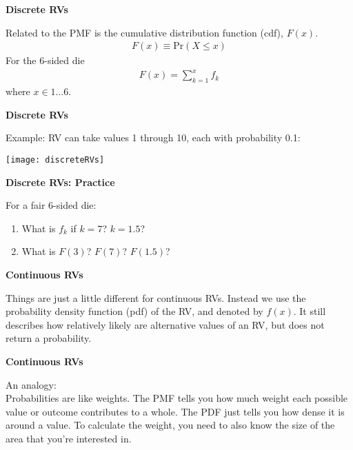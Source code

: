 \documentclass[12pt,xcolor=svgnames]{beamer}
\newcommand{\bl}{\color{blue}}
\newcommand{\theme}{\color{FireBrick}}
\newcommand{\sk}{\vspace{.4cm}}
\newcommand{\nsk}{\vspace{-.4cm}}
\newcommand{\chap}[1]{{\theme \Large \bf #1} \sk}
\newcommand{\pr}{\text{Pr}}
\begin{document}
\begin{frame}
\chap{Discrete RVs}

Related to the PMF is the {\bl cumulative distribution function} (cdf), $F(x)$. 
\begin{align*}
F(x) \equiv \pr(X \leq x)
\end{align*}
For the 6-sided die
\nsk
\begin{align*}
F(x)= \sum_{k=1}^x f_k
\end{align*}
where $x \in 1\dots 6$.  \\

\end{frame}


\begin{frame}
\chap{Discrete RVs}

Example: RV can take values 1 through 10, each with probability 0.1:

\begin{center}
\texttt{[image: discreteRVs]}
\end{center}

\end{frame}

\begin{frame}
\chap{Discrete RVs: Practice}

For a fair 6-sided die:

\begin{enumerate}
\item What is $f_k$ if $k=7$? $k=1.5$?
\item What is $F(3)$?  $F(7)$? $F(1.5)$?
\end{enumerate}

\end{frame}


\begin{frame}
\chap{Continuous RVs}

Things are just a little different for continuous RVs. Instead we use the {\bl probability density function} (pdf) of the RV, and denoted by $f(x)$. It still describes how relatively likely are alternative values of an RV, but does not return a probability.

\end{frame}

\begin{frame}
\chap{Continuous RVs}

An analogy:\\
\sk
Probabilities are like {\bl weights}. The PMF tells you how much weight each possible value or outcome contributes to a whole. The PDF just tells you how dense it is around a value. To calculate the weight, you need to also know the size of the area that you're interested in. 

\end{frame}
\end{document}
